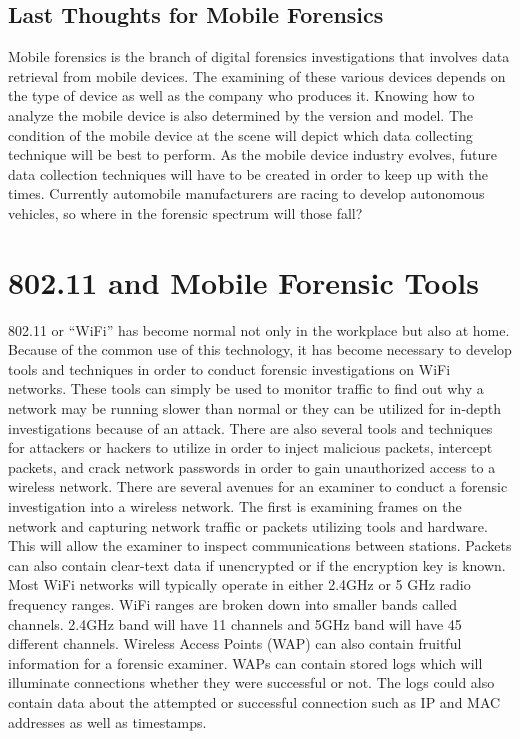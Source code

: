 \documentclass[acmlarge]{style/acmart}
\begin{document}
\subsection{Last Thoughts for Mobile Forensics}
	Mobile forensics is the branch of digital forensics investigations that involves data retrieval from mobile devices.  The examining of these various devices depends on the type of device as well as the company who produces it.  Knowing how to analyze the mobile device is also determined by the version and model.  The condition of the mobile device at the scene will depict which data collecting technique will be best to perform.  As the mobile device industry evolves, future data collection techniques will have to be created in order to keep up with the times.  Currently automobile manufacturers are racing to develop autonomous vehicles, so where in the forensic spectrum will those fall?

\section{802.11 and Mobile Forensic Tools}

802.11 or “WiFi” has become normal not only in the workplace but also at home. Because of the common use of this technology, it has become necessary to develop tools and techniques in order to conduct forensic investigations on WiFi networks. These tools can simply be used to monitor traffic to find out why a network may be running slower than normal or they can be utilized for in-depth investigations because of an attack. There are also several tools and techniques for attackers or hackers to utilize in order to inject malicious packets, intercept packets, and crack network passwords in order to gain unauthorized access to a wireless network. 
There are several avenues for an examiner to conduct a forensic investigation into a wireless network. The first is examining frames on the network and capturing network traffic or packets utilizing tools and hardware. This will allow the examiner to inspect communications between stations. Packets can also contain clear-text data if unencrypted or if the encryption key is known. Most WiFi networks will typically operate in either 2.4GHz or 5 GHz radio frequency ranges. WiFi ranges are broken down into smaller bands called channels. 2.4GHz band will have 11 channels and 5GHz band will have 45 different channels. 
Wireless Access Points (WAP) can also contain fruitful information for a forensic examiner. WAPs can contain stored logs which will illuminate connections whether they were successful or not. The logs could also contain data about the attempted or successful connection such as IP and MAC addresses as well as timestamps. 
\end{document}
